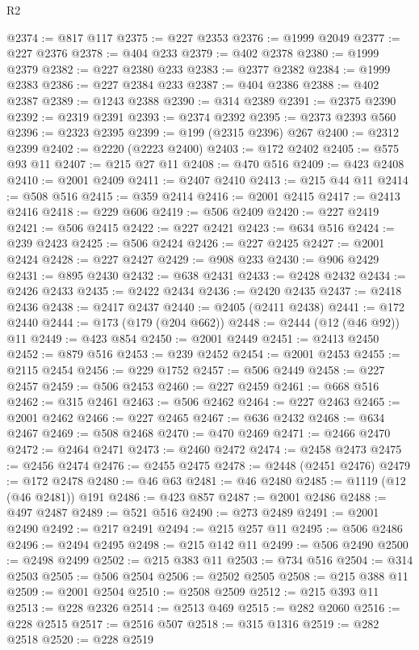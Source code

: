 \begin{lexlean}{R2}
\begin{coremodule}
@2374 := @817 @117
@2375 := @227 @2353
@2376 := @1999 @2049
@2377 := @227 @2376
@2378 := @404 @233
@2379 := @402 @2378
@2380 := @1999 @2379
@2382 := @227 @2380 @233
@2383 := @2377 @2382
@2384 := @1999 @2383
@2386 := @227 @2384 @233
@2387 := @404 @2386
@2388 := @402 @2387
@2389 := @1243 @2388
@2390 := @314 @2389
@2391 := @2375 @2390
@2392 := @2319 @2391
@2393 := @2374 @2392
@2395 := @2373 @2393 @560
@2396 := @2323 @2395
@2399 := @199 (@2315 @2396) @267
@2400 := @2312 @2399
@2402 := @2220 (@2223 @2400)
@2403 := @172 @2402
@2405 := @575 @93 @11
@2407 := @215 @27 @11
@2408 := @470 @516
@2409 := @423 @2408
@2410 := @2001 @2409
@2411 := @2407 @2410
@2413 := @215 @44 @11
@2414 := @508 @516
@2415 := @359 @2414
@2416 := @2001 @2415
@2417 := @2413 @2416
@2418 := @229 @606
@2419 := @506 @2409
@2420 := @227 @2419
@2421 := @506 @2415
@2422 := @227 @2421
@2423 := @634 @516
@2424 := @239 @2423
@2425 := @506 @2424
@2426 := @227 @2425
@2427 := @2001 @2424
@2428 := @227 @2427
@2429 := @908 @233
@2430 := @906 @2429
@2431 := @895 @2430
@2432 := @638 @2431
@2433 := @2428 @2432
@2434 := @2426 @2433
@2435 := @2422 @2434
@2436 := @2420 @2435
@2437 := @2418 @2436
@2438 := @2417 @2437
@2440 := @2405 (@2411 @2438)
@2441 := @172 @2440
@2444 := @173 (@179 (@204 @662))
@2448 := @2444 (@12 (@46 @92)) @11
@2449 := @423 @854
@2450 := @2001 @2449
@2451 := @2413 @2450
@2452 := @879 @516
@2453 := @239 @2452
@2454 := @2001 @2453
@2455 := @2115 @2454
@2456 := @229 @1752
@2457 := @506 @2449
@2458 := @227 @2457
@2459 := @506 @2453
@2460 := @227 @2459
@2461 := @668 @516
@2462 := @315 @2461
@2463 := @506 @2462
@2464 := @227 @2463
@2465 := @2001 @2462
@2466 := @227 @2465
@2467 := @636 @2432
@2468 := @634 @2467
@2469 := @508 @2468
@2470 := @470 @2469
@2471 := @2466 @2470
@2472 := @2464 @2471
@2473 := @2460 @2472
@2474 := @2458 @2473
@2475 := @2456 @2474
@2476 := @2455 @2475
@2478 := @2448 (@2451 @2476)
@2479 := @172 @2478
@2480 := @46 @63
@2481 := @46 @2480
@2485 := @1119 (@12 (@46 @2481)) @191
@2486 := @423 @857
@2487 := @2001 @2486
@2488 := @497 @2487
@2489 := @521 @516
@2490 := @273 @2489
@2491 := @2001 @2490
@2492 := @217 @2491
@2494 := @215 @257 @11
@2495 := @506 @2486
@2496 := @2494 @2495
@2498 := @215 @142 @11
@2499 := @506 @2490
@2500 := @2498 @2499
@2502 := @215 @383 @11
@2503 := @734 @516
@2504 := @314 @2503
@2505 := @506 @2504
@2506 := @2502 @2505
@2508 := @215 @388 @11
@2509 := @2001 @2504
@2510 := @2508 @2509
@2512 := @215 @393 @11
@2513 := @228 @2326
@2514 := @2513 @469
@2515 := @282 @2060
@2516 := @228 @2515
@2517 := @2516 @507
@2518 := @315 @1316
@2519 := @282 @2518
@2520 := @228 @2519

\end{coremodule}
\end{lexlean}
